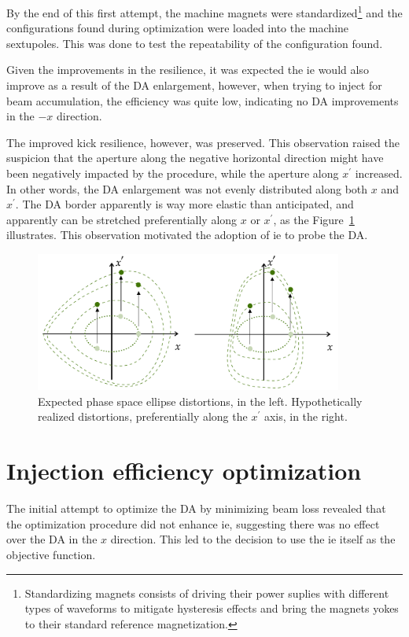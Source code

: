 By the end of this first attempt, the machine magnets were standardized\footnote{Standardizing magnets consists of driving their power suplies with different types of waveforms to mitigate hysteresis effects and bring the magnets yokes to their standard reference magnetization.} and the configurations found during optimization were loaded into the machine sextupoles. This was done to test the repeatability of the configuration found.

Given the improvements in the resilience, it was expected the \gls*{ie} would also improve as a result of the \gls*{DA} enlargement, however, when trying to inject for beam accumulation, the efficiency was quite low, indicating no \gls*{DA} improvements in the $-x$ direction.

The improved kick resilience, however, was preserved. This observation raised the suspicion that the aperture along the negative horizontal direction might have been negatively impacted by the procedure, while the aperture along $x^\prime$ increased. In other words, the \gls*{DA} enlargement was not evenly distributed along both $x$ and $x^\prime$. The \gls*{DA} border apparently is way more elastic than anticipated, and apparently can be stretched preferentially along $x$ or $x^\prime$, as the Figure~\ref{fig:expected_vs_reality_DA} illustrates. This observation motivated the adoption of \gls*{ie} to probe the \gls*{DA}.
\begin{figure}[htb]
    \centering
    \includegraphics[width=0.9\textwidth]{Images/elastic_phase_space_distortion.pdf}
    \caption[Expected phase space ellipse distortions vs. hypothetically realized distortions.]{Expected phase space ellipse distortions, in the left. Hypothetically realized distortions, preferentially along the $x^\prime$ axis, in the right.}
    \label{fig:expected_vs_reality_DA}
\end{figure}
\section{Injection efficiency optimization}
\label{sec:injeff_opt}
The initial attempt to optimize the \gls*{DA} by minimizing beam loss revealed that the optimization procedure did not enhance \gls*{ie}, suggesting there was no effect over the \gls*{DA} in the $x$ direction. This led to the decision to use the \gls*{ie} itself as the objective function.


